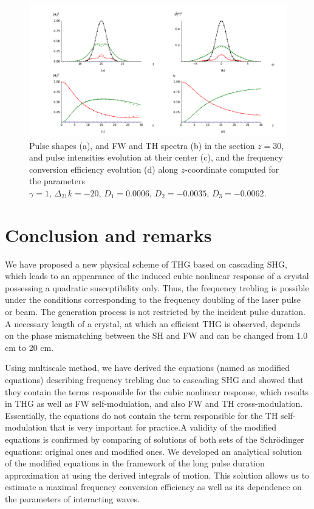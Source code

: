 \documentclass[a4paper, 12pt, onecolumn]{extarticle}
\begin{document}
\begin{figure}[h!] 
\centering 
\includegraphics[width=0.9\linewidth]{Cascade1_12}  
\caption{Pulse shapes (a), and FW and TH spectra (b) in the section \(z=30\), and pulse intensities evolution at their center (c), and the frequency conversion efficiency evolution (d) along \(z\)-coordinate computed for the parameters  $\gamma=1,\, \Delta_{21} k=-20,\, D_1=0.0006,\, D_2=-0.0035,\, D_3=-0.0062.$} 
\label{fr:c1_12}
\end{figure}

\section{Conclusion and remarks}
We have proposed a new physical scheme of THG based on cascading SHG, which leads to an appearance of the induced cubic nonlinear response of a crystal possessing a quadratic susceptibility only. Thus, the frequency trebling is possible under the conditions corresponding to the frequency doubling of the laser pulse or beam. The generation process is not restricted by the incident pulse duration. A necessary length of a crystal, at which an efficient THG is observed, depends on the phase mismatching between the SH and FW and can be changed from 1.0 cm to 20 cm. 

Using multiscale method, we have derived the equations (named as modified equations) describing frequency trebling due to cascading SHG and showed that they contain the terms responsible for the cubic nonlinear response, which results in THG as well as FW self-modulation, and also FW and TH cross-modulation. Essentially, the equations do not contain the term responsible for the TH self-modulation that is very important for practice.A validity of the modified equations is confirmed by comparing of solutions of both sets of the Schr\"{o}dinger equations: original ones and modified ones. We developed an analytical solution of the modified equations in the framework of the long pulse duration approximation at using the derived integrals of motion. This solution allows us to estimate a maximal frequency conversion efficiency as well as its dependence on the parameters of interacting waves.
\end{document}
